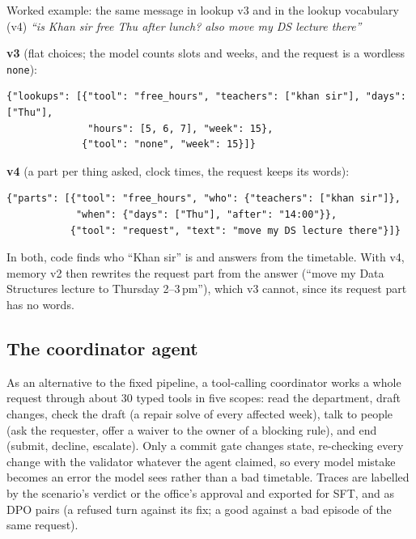 \documentclass[11pt,a4paper]{article}
\begin{document}
\begin{bluebox}{Worked example: the same message in lookup v3 and in the lookup vocabulary (v4)}
\small
\emph{``is Khan sir free Thu after lunch? also move my DS lecture there''}

\textbf{v3} (flat choices; the model counts slots and weeks, and the request is a wordless \texttt{none}):
\begin{verbatim}
{"lookups": [{"tool": "free_hours", "teachers": ["khan sir"], "days": ["Thu"],
              "hours": [5, 6, 7], "week": 15},
             {"tool": "none", "week": 15}]}
\end{verbatim}
\textbf{v4} (a part per thing asked, clock times, the request keeps its words):
\begin{verbatim}
{"parts": [{"tool": "free_hours", "who": {"teachers": ["khan sir"]},
            "when": {"days": ["Thu"], "after": "14:00"}},
           {"tool": "request", "text": "move my DS lecture there"}]}
\end{verbatim}
In both, code finds who ``Khan sir'' is and answers from the timetable. With v4, memory v2 then rewrites the request
part from the answer (``move my Data Structures lecture to Thursday 2--3\,pm''), which v3 cannot, since its request
part has no words.
\end{bluebox}

\subsection{The coordinator agent}
\label{sec:method-agent}
As an alternative to the fixed pipeline, a tool-calling coordinator works a whole request through about 30 typed tools in five scopes: read the department, draft changes, check the draft
(a repair solve of every affected week), talk to people (ask the requester, offer a waiver to the owner of a blocking
rule), and end (submit, decline, escalate). Only a commit gate changes state, re-checking every change with the
validator whatever the agent claimed, so every model mistake becomes an error the model sees rather than a bad
timetable. Traces are labelled by the scenario's verdict or the office's approval and exported for SFT, and as DPO
pairs (a refused turn against its fix; a good against a bad episode of the same request).
\end{document}
